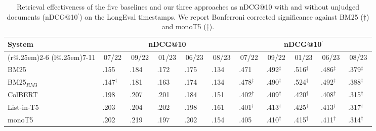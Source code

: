 \begin{table}[t]
\small
\centering
\renewcommand{\tabcolsep}{1.6pt}
\caption{Retrieval effectiveness of the five baselines and our three approaches as nDCG@10 with and without unjudged documents (nDCG@10$^{'}$) on the LongEval timestamps. We report Bonferroni corrected significance against BM25 ($\dagger$) and monoT5 ($\ddagger$).}
\label{tab:table-results}

\begin{tabular}{@{}l@{}cccccccccc@{}}
    \toprule
    \bfseries System & \multicolumn{5}{c}{\bfseries nDCG@10} & \multicolumn{5}{c}{\bfseries nDCG@10$^{'}$}\\
    \cmidrule(r@{.25em}){2-6}
    \cmidrule(l@{.25em}){7-11}
    
    & 07/22 & 09/22 & 01/23 & 06/23 & 08/23 & 07/22 & 09/22 & 01/23 & 06/23 & 08/23\\
    
    \midrule

BM25 & .155$^{\phantom{\dagger\ddagger}}$ & .184$^{\phantom{\dagger\ddagger}}$ & .172$^{\phantom{\dagger\ddagger}}$ & .175$^{\phantom{\dagger\ddagger}}$ & .134$^{\phantom{\dagger\ddagger}}$ & .471$^{\phantom{\dagger\ddagger}}$ & .492$^{\ddagger\phantom{\dagger}}$ & .516$^{\ddagger\phantom{\dagger}}$ & .486$^{\ddagger\phantom{\dagger}}$ & .379$^{\ddagger\phantom{\dagger}}$ \\
    BM25$_{RM3}$ & .147$^{\ddagger\phantom{\dagger}}$ & .181$^{\phantom{\dagger\ddagger}}$ & .163$^{\phantom{\dagger\ddagger}}$ & .174$^{\phantom{\dagger\ddagger}}$ & .134$^{\phantom{\dagger\ddagger}}$ & .478$^{\ddagger\phantom{\dagger}}$ & .490$^{\ddagger\phantom{\dagger}}$ & .524$^{\ddagger\phantom{\dagger}}$ & .492$^{\ddagger\phantom{\dagger}}$ & .388$^{\ddagger\phantom{\dagger}}$ \\
    ColBERT & .198$^{\phantom{\dagger\ddagger}}$ & .207$^{\phantom{\dagger\ddagger}}$ & .201$^{\phantom{\dagger\ddagger}}$ & .184$^{\phantom{\dagger\ddagger}}$ & .151$^{\phantom{\dagger\ddagger}}$ & .402$^{\dagger\phantom{\ddagger}}$ & .409$^{\dagger\phantom{\ddagger}}$ & .420$^{\dagger\phantom{\ddagger}}$ & .408$^{\dagger\phantom{\ddagger}}$ & .315$^{\dagger\phantom{\ddagger}}$ \\
    List-in-T5 & .203$^{\phantom{\dagger\ddagger}}$ & .204$^{\phantom{\dagger\ddagger}}$ & .202$^{\phantom{\dagger\ddagger}}$ & .198$^{\phantom{\dagger\ddagger}}$ & .161$^{\phantom{\dagger\ddagger}}$ & .401$^{\dagger\phantom{\ddagger}}$ & .413$^{\dagger\phantom{\ddagger}}$ & .425$^{\dagger\phantom{\ddagger}}$ & .413$^{\dagger\phantom{\ddagger}}$ & .317$^{\dagger\phantom{\ddagger}}$ \\
    monoT5 & .202$^{\phantom{\dagger\ddagger}}$ & .219$^{\phantom{\dagger\ddagger}}$ & .197$^{\phantom{\dagger\ddagger}}$ & .202$^{\phantom{\dagger\ddagger}}$ & .154$^{\phantom{\dagger\ddagger}}$ & .405$^{\phantom{\dagger\ddagger}}$ & .410$^{\dagger\phantom{\ddagger}}$ & .415$^{\dagger\phantom{\ddagger}}$ & .411$^{\dagger\phantom{\ddagger}}$ & .314$^{\dagger\phantom{\ddagger}}$ \\
    

\end{tabular}
\end{table}
